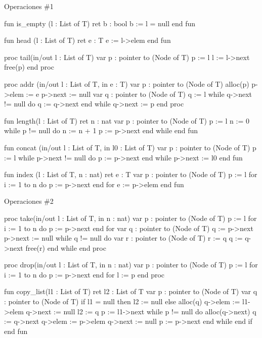 \begin{codebox}{Operaciones \#1}
\begin{pascallike}
fun is_empty (l : List of T) ret b : bool
    b := l = null
end fun

fun head (l : List of T) ret e : T
    e := l->elem
end fun

proc tail(in/out l : List of T)
    var p : pointer to (Node of T)
    p := l
    l := l->next
    free(p)
end proc

proc addr (in/out l : List of T, in e : T)
    var p : pointer to (Node of T)
    alloc(p)
    p->elem := e
    p->next := null
    var q : pointer to (Node of T)
    q := l
    while q->next != null do
        q := q->next
    end while
    q->next := p
end proc

fun length(l : List of T) ret n : nat
    var p : pointer to (Node of T)
    p := l
    n := 0
    while p != null do
        n := n + 1
        p := p->next
    end while
end fun

fun concat (in/out l : List of T, in l0 : List of T)
    var p : pointer to (Node of T)
    p := l
    while p->next != null do
        p := p->next
    end while
    p->next := l0
end fun

fun index (l : List of T, n : nat) ret e : T
    var p : pointer to (Node of T)
    p := l
    for i := 1 to n do
        p := p->next
    end for
    e := p->elem
end fun
\end{pascallike}
\end{codebox}

\begin{codebox}{Operaciones \#2}
\begin{pascallike}
proc take(in/out l : List of T, in n : nat)
    var p : pointer to (Node of T)
    p := l
    for i := 1 to n do
        p := p->next
    end for
    var q : pointer to (Node of T)
    q := p->next
    p->next := null
    while q != null do
        var r : pointer to (Node of T)
        r := q
        q := q->next
        free(r)
    end while
end proc

proc drop(in/out l : List of T, in n : nat)
    var p : pointer to (Node of T)
    p := l
    for i := 1 to n do
        p := p->next
    end for
    l := p
end proc

fun copy_list(l1 : List of T) ret l2 : List of T
    var p : pointer to (Node of T)
    var q : pointer to (Node of T)
    if l1 = null then
        l2 := null
    else
        alloc(q)
        q->elem := l1->elem
        q->next := null
        l2 := q
        p := l1->next
        while p != null do
            alloc(q->next)
            q := q->next
            q->elem := p->elem
            q->next := null
            p := p->next
        end while
    end if
end fun
\end{pascallike}
\end{codebox}

